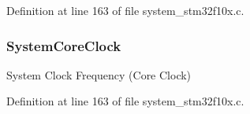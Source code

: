 Definition at line 163 of file system\+\_\+stm32f10x.\+c.

\subsubsection[{\texorpdfstring{System\+Core\+Clock}{SystemCoreClock}}]{ System\+Core\+Clock}\hypertarget{group___s_t_m32_f10x___system___exported__types_gaa3cd3e43291e81e795d642b79b6088e6}{}\label{group___s_t_m32_f10x___system___exported__types_gaa3cd3e43291e81e795d642b79b6088e6}
System Clock Frequency (Core Clock) 

Definition at line 163 of file system\+\_\+stm32f10x.\+c.

